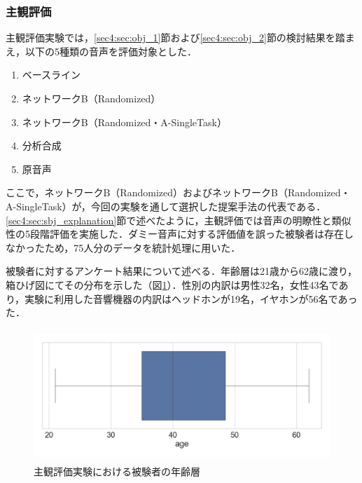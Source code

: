 \clearpage

\subsubsection{主観評価}
主観評価実験では，\ref{sec4:sec:obj_1}節および\ref{sec4:sec:obj_2}節の検討結果を踏まえ，以下の5種類の音声を評価対象とした．
\begin{enumerate}
    \item ベースライン
    \item ネットワークB（Randomized）
    \item ネットワークB（Randomized・A-SingleTask）
    \item 分析合成
    \item 原音声
\end{enumerate}
ここで，ネットワークB（Randomized）およびネットワークB（Randomized・A-SingleTask）が，今回の実験を通して選択した提案手法の代表である．\ref{sec4:sec:sbj_explanation}節で述べたように，主観評価では音声の明瞭性と類似性の5段階評価を実施した．ダミー音声に対する評価値を誤った被験者は存在しなかったため，75人分のデータを統計処理に用いた．

被験者に対するアンケート結果について述べる．年齢層は21歳から62歳に渡り，箱ひげ図にてその分布を示した（図\ref{sec4:fig:age}）．性別の内訳は男性32名，女性43名であり，実験に利用した音響機器の内訳はヘッドホンが19名，イヤホンが56名であった．
\begin{figure}[b]
    \centering
    \includegraphics[height=50mm]{./figure/sec4/sbj/age.png}
    \caption{主観評価実験における被験者の年齢層}
    \label{sec4:fig:age}
\end{figure}

